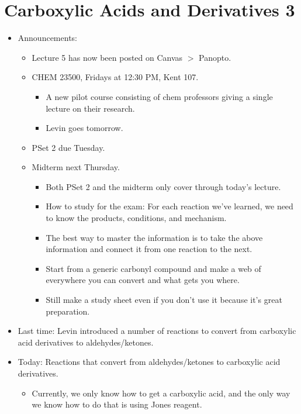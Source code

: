 \documentclass[../notes.tex]{subfiles}
\begin{document}
\section{Carboxylic Acids and Derivatives 3}
\begin{itemize}
    \item {}Announcements:
    \begin{itemize}
        \item Lecture 5 has now been posted on Canvas $>$ Panopto.
        \item CHEM 23500, Fridays at 12:30 PM, Kent 107.
        \begin{itemize}
            \item A new pilot course consisting of chem professors giving a single lecture on their research.
            \item Levin goes tomorrow.
        \end{itemize}
        \item PSet 2 due Tuesday.
        \item Midterm next Thursday.
        \begin{itemize}
            \item Both PSet 2 and the midterm only cover through today's lecture.
            \item How to study for the exam: For each reaction we've learned, we need to know the products, conditions, and mechanism.
            \item The best way to master the information is to take the above information and connect it from one reaction to the next.
            \item Start from a generic carbonyl compound and make a web of everywhere you can convert and what gets you where.
            \item Still make a study sheet even if you don't use it because it's great preparation.
        \end{itemize}
    \end{itemize}
    \item Last time: Levin introduced a number of reactions to convert from carboxylic acid derivatives to aldehydes/ketones.
    \item Today: Reactions that convert from aldehydes/ketones to carboxylic acid derivatives.
    \begin{itemize}
        \item Currently, we only know how to get a carboxylic acid, and the only way we know how to do that is using Jones reagent.

\end{itemize}
\end{itemize}
\end{document}
